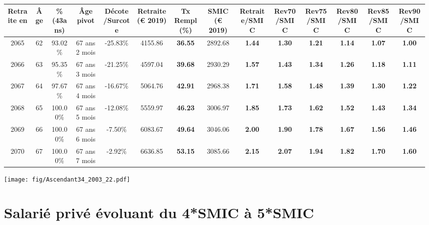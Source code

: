 \begin{adjustbox}{max width=\textwidth} 
\begin{tabular}[htb]{|c|c||c|c|c||c|c||c||c|c|c|c|c|c|} 
\hline 
 Retraite en &  Âge &  \%(43ans) &  Âge pivot &  Décote/Surcote &  Retraite (\euro{} 2019) &  Tx Rempl(\%) &  SMIC (\euro{} 2019) &  Retraite/SMIC &  Rev70/SMIC &  Rev75/SMIC &  Rev80/SMIC &  Rev85/SMIC &  Rev90/SMIC \\ 
\hline \hline 
 2065 &  62 &  93.02\% &  67 ans 2 mois &  -25.83\% &  4155.86 &  {\bf 36.55} &  2892.68 &  {\bf 1.44} &  {\bf 1.30} &  {\bf 1.21} &  {\bf 1.14} &  {\bf 1.07} &  {\bf 1.00} \\ 
\hline 
 2066 &  63 &  95.35\% &  67 ans 3 mois &  -21.25\% &  4597.04 &  {\bf 39.68} &  2930.29 &  {\bf 1.57} &  {\bf 1.43} &  {\bf 1.34} &  {\bf 1.26} &  {\bf 1.18} &  {\bf 1.11} \\ 
\hline 
 2067 &  64 &  97.67\% &  67 ans 4 mois &  -16.67\% &  5064.76 &  {\bf 42.91} &  2968.38 &  {\bf 1.71} &  {\bf 1.58} &  {\bf 1.48} &  {\bf 1.39} &  {\bf 1.30} &  {\bf 1.22} \\ 
\hline 
 2068 &  65 &  100.00\% &  67 ans 5 mois &  -12.08\% &  5559.97 &  {\bf 46.23} &  3006.97 &  {\bf 1.85} &  {\bf 1.73} &  {\bf 1.62} &  {\bf 1.52} &  {\bf 1.43} &  {\bf 1.34} \\ 
\hline 
 2069 &  66 &  100.00\% &  67 ans 6 mois &  -7.50\% &  6083.67 &  {\bf 49.64} &  3046.06 &  {\bf 2.00} &  {\bf 1.90} &  {\bf 1.78} &  {\bf 1.67} &  {\bf 1.56} &  {\bf 1.46} \\ 
\hline 
 2070 &  67 &  100.00\% &  67 ans 7 mois &  -2.92\% &  6636.85 &  {\bf 53.15} &  3085.66 &  {\bf 2.15} &  {\bf 2.07} &  {\bf 1.94} &  {\bf 1.82} &  {\bf 1.70} &  {\bf 1.60} \\ 
\hline 
\hline 
\end{tabular} 
\end{adjustbox} 
 
 \vspace{0.1cm} 

 \begin{center}\texttt{[image: fig/Ascendant34\_2003\_22.pdf]}\end{center} \label{fig/Ascendant34_2003_22.pdf} 

\newpage 
 
\chapter{Salarié privé évoluant du 4*SMIC à 5*SMIC} 


